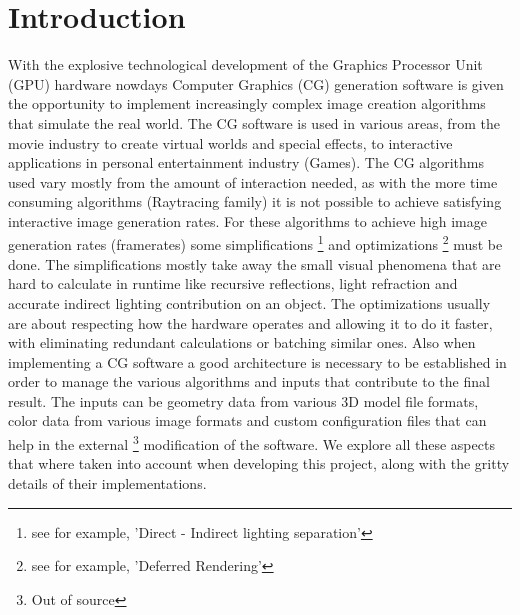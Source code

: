 \section{Introduction}
With the explosive technological development of the Graphics Processor Unit (GPU) hardware nowdays
Computer Graphics (CG) generation software is given the opportunity to implement increasingly complex image
creation algorithms that simulate the real world. The CG software is used in various areas, from the movie
industry to create virtual worlds and special effects, to interactive applications in personal entertainment
industry (Games). The CG algorithms used vary mostly from the amount of interaction needed, as with the more
time consuming algorithms (Raytracing family) it is not possible to achieve satisfying interactive image
generation rates. For these algorithms to achieve high image generation rates (framerates) some simplifications
\footnote{see for example, 'Direct - Indirect lighting separation'} and optimizations \footnote{see for example,
'Deferred Rendering'} must be done. The simplifications mostly take away the small visual phenomena that are
hard to calculate in runtime like recursive reflections, light refraction and accurate indirect lighting
contribution on an object. The optimizations usually are about respecting how the hardware operates and allowing
it to do it faster, with eliminating redundant calculations or batching similar ones. Also when implementing a
CG software a good architecture is necessary to be established in order to manage the various algorithms and
inputs that contribute to the final result. The inputs can be geometry data from various 3D model file formats,
color data from various image formats and custom configuration files that can help in the external
\footnote{Out of source} modification of the software. We explore all these aspects that where taken into
account when developing this project, along with the gritty details of their implementations.
